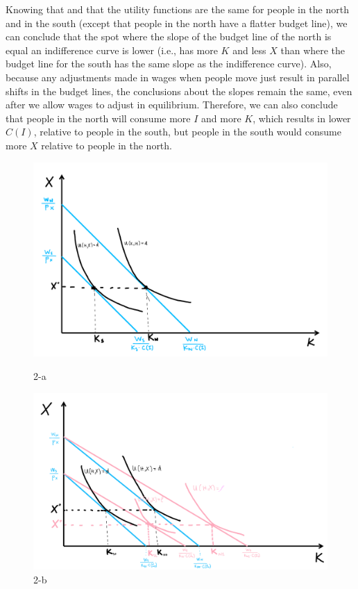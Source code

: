 \documentclass[12pt]{paper}
\begin{document}
Knowing that and that the utility functions are the same for people in the north and in the south (except that people in the north have a flatter budget line), we can conclude that the spot where the slope of the budget line of the north is equal an indifference curve is lower (i.e., has more $K$ and less $X$ than where the budget line for the south has the same slope as the indifference curve). Also, because any adjustments made in wages when people move just result in parallel shifts in the budget lines, the conclusions about the slopes remain the same, even after we allow wages to adjust in equilibrium. Therefore, we can also conclude that people in the north will consume more $I$ and more $K$, which results in lower $C(I)$, relative to people in the south, but people in the south would consume more $X$ relative to people in the north.


\begin{figure}
\includegraphics[width=\textwidth]{2-a}
\caption{2-a}
\includegraphics[width=\textwidth]{2-b}
\caption{2-b}
\end{figure}
\end{document}

